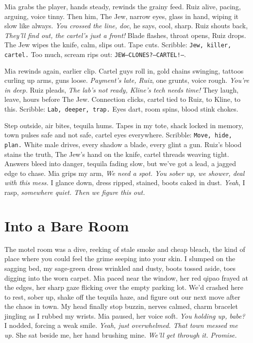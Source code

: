\documentclass[12pt,oneside]{book}
\newcommand{\note}[1]{\texttt{#1}}
\begin{document}
Mia grabs the player, hands steady, rewinds the grainy feed. Ruiz alive, pacing, arguing, voice tinny. Then him, The Jew, narrow eyes, glass in hand, wiping it slow like always. \textit{You crossed the line, doc}, he says, cool, sharp. Ruiz shouts back, \textit{They’ll find out, the cartel’s just a front!} Blade flashes, throat opens, Ruiz drops. The Jew wipes the knife, calm, slips out. Tape cuts. Scribble: \note{Jew, killer, cartel.} Too much, scream rips out: \note{JEW—CLONES?—CARTEL!—}.

Mia rewinds again, earlier clip. Cartel guys roll in, gold chains swinging, tattoos curling up arms, guns loose. \textit{Payment’s late, Ruiz}, one grunts, voice rough. \textit{You’re in deep.} Ruiz pleads, \textit{The lab’s not ready, Kline’s tech needs time!} They laugh, leave, hours before The Jew. Connection clicks, cartel tied to Ruiz, to Kline, to this. Scribble: \note{Lab, deeper, trap.} Eyes dart, room spins, blood stink chokes.

Step outside, air bites, tequila hums. Tapes in my tote, shack locked in memory, town pulses safe and not safe, cartel eyes everywhere. Scribble: \note{Move, hide, plan.} White male drives, every shadow a blade, every glint a gun. Ruiz’s blood stains the truth, The Jew’s hand on the knife, cartel threads weaving tight. Answers bleed into danger, tequila fading slow, but we’ve got a lead, a jagged edge to chase. Mia grips my arm, \textit{We need a spot. You sober up, we shower, deal with this mess.} I glance down, dress ripped, stained, boots caked in dust. \textit{Yeah}, I rasp, \textit{somewhere quiet. Then we figure this out.}

\chapter{Into a Bare Room}

The motel room was a dive, reeking of stale smoke and cheap bleach, the kind of place where you could feel the grime seeping into your skin. I slumped on the sagging bed, my sage-green dress wrinkled and dusty, boots tossed aside, toes digging into the worn carpet. Mia paced near the window, her red qipao frayed at the edges, her sharp gaze flicking over the empty parking lot. We’d crashed here to rest, sober up, shake off the tequila haze, and figure out our next move after the chaos in town. My head finally stop buzzin, nerves calmed, charm bracelet jingling as I rubbed my wrists. Mia paused, her voice soft. \textit{You holding up, babe?} I nodded, forcing a weak smile. \textit{Yeah, just overwhelmed. That town messed me up.} She sat beside me, her hand brushing mine. \textit{We’ll get through it. Promise.}
\end{document}
